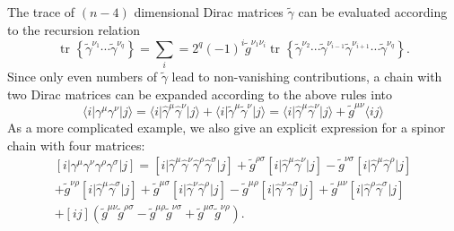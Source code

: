 \documentclass[preprint,number,12pt,sort&compress]{elsarticle}
\DeclareMathOperator{\Trace}{tr}
\newcommand{\tr}[2][{}]{\Trace^{#1}\!\left\{{#2}\right\}}
\newcommand{\Spaa}[1]{\langle #1 \rangle}
\newcommand{\Spbb}[1]{[ #1 ]}
\begin{document}
The trace of $(n-4)$ dimensional Dirac matrices $\tilde{\gamma}$ can be
evaluated according to the recursion relation
\begin{equation}
\tr{\tilde{\gamma}^{\nu_1}\cdots\tilde{\gamma}^{\nu_q}}=
\sum_i=2^q(-1)^i\tilde{g}^{\nu_1\nu_i}
\tr{\tilde{\gamma}^{\nu_2}\cdots\tilde{\gamma}^{\nu_{i-1}}%
\tilde{\gamma}^{\nu_{i+1}}\cdots\tilde{\gamma}^{\nu_q}}.
\end{equation}
Since only even numbers of $\tilde{\gamma}$ lead to non-vanishing
contributions, a chain with two Dirac matrices can be expanded
according to the above rules into
\begin{equation}\label{eq:tHooft-example01}
\Spaa{i\vert\gamma^\mu\gamma^\nu\vert j}=
\Spaa{i\vert\hat{\gamma}^\mu\hat{\gamma}^\nu\vert j}+
\Spaa{i\vert\tilde{\gamma}^\mu\tilde{\gamma}^\nu\vert j}=
\Spaa{i\vert\hat{\gamma}^\mu\hat{\gamma}^\nu\vert j}+
\tilde{g}^{\mu\nu}\Spaa{ij}
\end{equation}
As a more complicated example, we also give an explicit expression
for a spinor chain with four matrices:
\begin{multline}\label{eq:tHooft-example02}
\Spbb{i\vert\gamma^\mu\gamma^\nu\gamma^\rho\gamma^\sigma\vert j}=
\Spbb{i\vert\hat{\gamma}^\mu\hat{\gamma}^\nu%
\hat{\gamma}^\rho\hat{\gamma}^\sigma\vert j}
+\tilde{g}^{\rho\sigma}\Spbb{i\vert\hat{\gamma}^\mu\hat{\gamma}^\nu\vert j}
-\tilde{g}^{\nu\sigma}\Spbb{i\vert\hat{\gamma}^\mu\hat{\gamma}^\rho\vert j}\\
+\tilde{g}^{\nu\rho}\Spbb{i\vert\hat{\gamma}^\mu\hat{\gamma}^\sigma\vert j}
+\tilde{g}^{\mu\sigma}\Spbb{i\vert\hat{\gamma}^\nu\hat{\gamma}^\rho\vert j}
-\tilde{g}^{\mu\rho}\Spbb{i\vert\hat{\gamma}^\nu\hat{\gamma}^\sigma\vert j}
+\tilde{g}^{\mu\nu}\Spbb{i\vert\hat{\gamma}^\rho\hat{\gamma}^\sigma\vert j}\\
+\Spbb{ij}\left(
 \tilde{g}^{\mu\nu}\tilde{g}^{\rho\sigma}
-\tilde{g}^{\mu\rho}\tilde{g}^{\nu\sigma}
+\tilde{g}^{\mu\sigma}\tilde{g}^{\nu\rho}\right)\text{.}
\end{multline}

\end{document}
